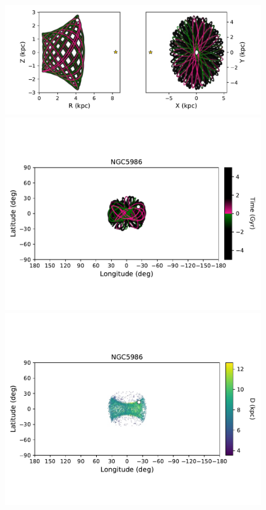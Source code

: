             \begin{figure}
                \begin{center}
                    \includegraphics[clip=true, trim = 0mm 2mm 0mm 0mm, width=0.9\columnwidth]{images/PII_individual_NGC5986_NGC5986orbitRZXY.pdf}
                    \includegraphics[clip=true, trim = 0mm 20mm 0mm 10mm, width=0.9\columnwidth]{images/PII_individual_NGC5986_NGC5986orbit.pdf}
                    \includegraphics[clip=true, trim = 0mm 20mm 0mm 10mm, width=0.9\columnwidth]{images/PII_individual_NGC5986_NGC5986_LB_D.pdf}

\end{center}
\end{figure}
